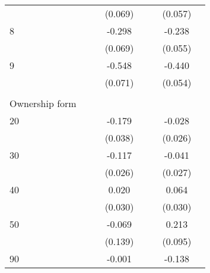 \begin{longtable}{l*{3}{c}|l*{3}{c}}
	&                     &                     &     (0.069)         &                     &                     &     (0.057)         \\
	8                   &                     &                     &      -0.298\sym{***}&                     &                     &      -0.238\sym{***}\\
	&                     &                     &     (0.069)         &                     &                     &     (0.055)         \\
	9                   &                     &                     &      -0.548\sym{***}&                     &                     &      -0.440\sym{***}\\
	&                     &                     &     (0.071)         &                     &                     &     (0.054)         \\
	&&&&&&&\\
	Ownership form &&&&&&\\
	20                  &                     &                     &      -0.179\sym{***}&                     &                     &      -0.028         \\
	&                     &                     &     (0.038)         &                     &                     &     (0.026)         \\
	30                  &                     &                     &      -0.117\sym{***}&                     &                     &      -0.041         \\
	&                     &                     &     (0.026)         &                     &                     &     (0.027)         \\
	40                  &                     &                     &       0.020         &                     &                     &       0.064\sym{**} \\
	&                     &                     &     (0.030)         &                     &                     &     (0.030)         \\
	50                  &                     &                     &      -0.069         &                     &                     &       0.213\sym{**} \\
	&                     &                     &     (0.139)         &                     &                     &     (0.095)         \\
	90                  &                     &                     &      -0.001         &                     &                     &      -0.138         \\

\end{longtable}
